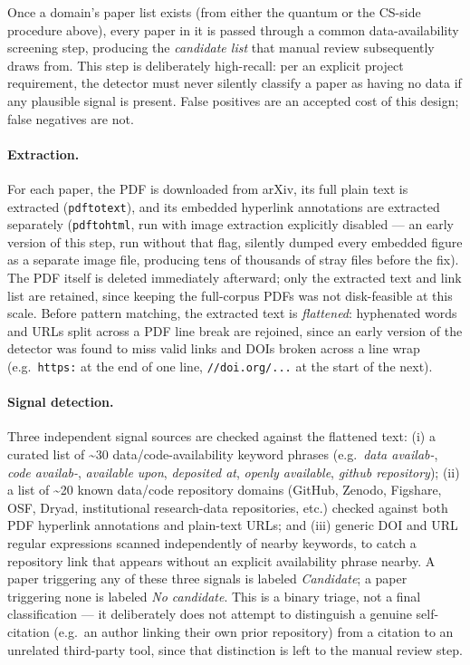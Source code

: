 \documentclass[11pt]{article}
\begin{document}
Once a domain's paper list exists (from either the quantum or the CS-side procedure
above), every paper in it is passed through a common data-availability screening step,
producing the \emph{candidate list} that manual review subsequently draws from. This
step is deliberately high-recall: per an explicit project requirement, the detector must
never silently classify a paper as having no data if any plausible signal is present.
False positives are an accepted cost of this design; false negatives are not.

\paragraph{Extraction.} For each paper, the PDF is downloaded from arXiv, its full
plain text is extracted (\texttt{pdftotext}), and its embedded hyperlink annotations
are extracted separately (\texttt{pdftohtml}, run with image extraction explicitly
disabled --- an early version of this step, run without that flag, silently dumped
every embedded figure as a separate image file, producing tens of thousands of stray
files before the fix). The PDF itself is deleted immediately afterward; only the
extracted text and link list are retained, since keeping the full-corpus PDFs was not
disk-feasible at this scale. Before pattern matching, the extracted text is
\emph{flattened}: hyphenated words and URLs split across a PDF line break are rejoined,
since an early version of the detector was found to miss valid links and DOIs broken
across a line wrap (e.g.\ \texttt{https:} at the end of one line, \texttt{//doi.org/...}
at the start of the next).

\paragraph{Signal detection.} Three independent signal sources are checked against the
flattened text: (i) a curated list of \textasciitilde30 data/code-availability
keyword phrases (e.g.\ \emph{data availab-}, \emph{code availab-}, \emph{available
upon}, \emph{deposited at}, \emph{openly available}, \emph{github repository}); (ii) a
list of \textasciitilde20 known data/code repository domains (GitHub, Zenodo, Figshare,
OSF, Dryad, institutional research-data repositories, etc.) checked against both PDF
hyperlink annotations and plain-text URLs; and (iii) generic DOI and URL regular
expressions scanned independently of nearby keywords, to catch a repository link that
appears without an explicit availability phrase nearby. A paper triggering any of these
three signals is labeled \emph{Candidate}; a paper triggering none is labeled \emph{No
candidate}. This is a binary triage, not a final classification --- it deliberately
does not attempt to distinguish a genuine self-citation (e.g.\ an author linking their
own prior repository) from a citation to an unrelated third-party tool, since that
distinction is left to the manual review step.
\end{document}

